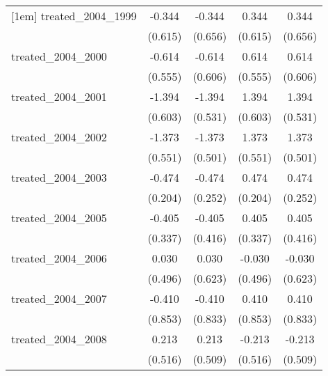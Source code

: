 {\begin{tabular}{l*{4}{c}}
[1em]
treated\_2004\_1999&      -0.344         &      -0.344         &       0.344         &       0.344         \\
            &     (0.615)         &     (0.656)         &     (0.615)         &     (0.656)         \\
[1em]
treated\_2004\_2000&      -0.614         &      -0.614         &       0.614         &       0.614         \\
            &     (0.555)         &     (0.606)         &     (0.555)         &     (0.606)         \\
[1em]
treated\_2004\_2001&      -1.394\sym{*}  &      -1.394\sym{**} &       1.394\sym{*}  &       1.394\sym{**} \\
            &     (0.603)         &     (0.531)         &     (0.603)         &     (0.531)         \\
[1em]
treated\_2004\_2002&      -1.373\sym{*}  &      -1.373\sym{**} &       1.373\sym{*}  &       1.373\sym{**} \\
            &     (0.551)         &     (0.501)         &     (0.551)         &     (0.501)         \\
[1em]
treated\_2004\_2003&      -0.474\sym{*}  &      -0.474         &       0.474\sym{*}  &       0.474         \\
            &     (0.204)         &     (0.252)         &     (0.204)         &     (0.252)         \\
[1em]
treated\_2004\_2005&      -0.405         &      -0.405         &       0.405         &       0.405         \\
            &     (0.337)         &     (0.416)         &     (0.337)         &     (0.416)         \\
[1em]
treated\_2004\_2006&       0.030         &       0.030         &      -0.030         &      -0.030         \\
            &     (0.496)         &     (0.623)         &     (0.496)         &     (0.623)         \\
[1em]
treated\_2004\_2007&      -0.410         &      -0.410         &       0.410         &       0.410         \\
            &     (0.853)         &     (0.833)         &     (0.853)         &     (0.833)         \\
[1em]
treated\_2004\_2008&       0.213         &       0.213         &      -0.213         &      -0.213         \\
            &     (0.516)         &     (0.509)         &     (0.516)         &     (0.509)         \\

\end{tabular}}
